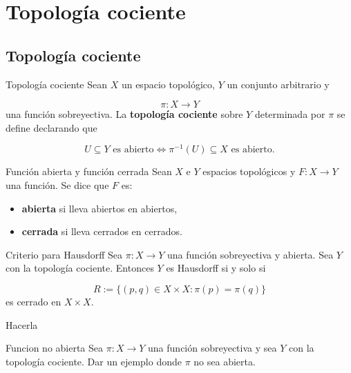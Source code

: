 \chapter{Topología cociente}
\label{ch:teo-3}
\section{Topología cociente}
\begin{bookdefinition}{Topología cociente}
Sean $X$ un espacio topológico, $Y$ un conjunto arbitrario y

\[
\pi:X\longrightarrow Y
\]
una función sobreyectiva. La \textbf{topología cociente} sobre $Y$ determinada por $\pi$ se define declarando que

\[
U\subseteq Y \text{ es abierto}
\iff
\pi^{-1}(U)\subseteq X \text{ es abierto}.
\]
\end{bookdefinition}
\begin{bookdefinition}{Función abierta y función cerrada}
Sean $X$ e $Y$ espacios topológicos y $F:X\to Y$ una función. Se dice que $F$ es:

\begin{itemize}
\item \textbf{abierta} si lleva abiertos en abiertos,
\item \textbf{cerrada} si lleva cerrados en cerrados.
\end{itemize}
\end{bookdefinition}
\begin{bookexercise}{Criterio para Hausdorff}
Sea $\pi:X\to Y$ una función sobreyectiva y abierta. Sea $Y$ con la topología cociente. Entonces $Y$ es Hausdorff si y solo si

\[
R:=\{(p,q)\in X\times X:\pi(p)=\pi(q)\}
\]
es cerrado en $X\times X$.

\end{bookexercise}
\begin{bookproof}{}
Hacerla

\bookqed
\end{bookproof}
\label{blk:d48425}
\begin{bookremark}{Funcion no abierta}
Sea $\pi:X\to Y$ una función sobreyectiva y sea $Y$ con la topología cociente. Dar un ejemplo donde $\pi$ no sea abierta.

\end{bookremark}
